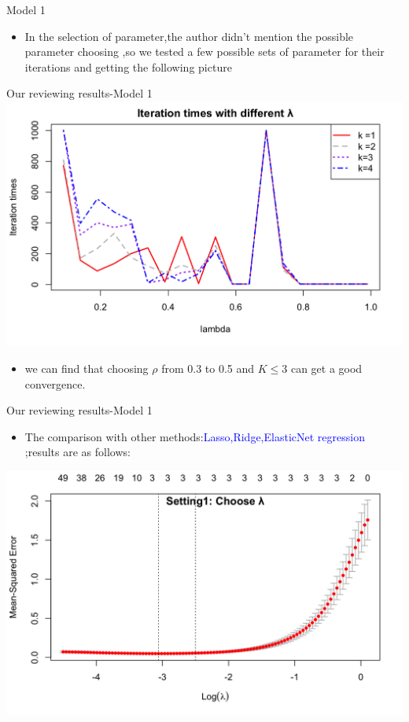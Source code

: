 \documentclass{beamer}
\begin{document}
\begin{frame}{Model 1}
    \begin{itemize}
        \item In the selection of parameter,the author didn't mention the possible parameter choosing ,so we tested a few possible sets of parameter for their iterations and getting the following picture 
    \end{itemize}
\end{frame}
\begin{frame}{Our reviewing results-Model 1}
    \includegraphics[scale=0.2]{plot1.png}
    \begin{itemize}
        \item we can find that choosing $\rho $ from 0.3 to 0.5 and $K\leqslant3 $ can get a good convergence.
    \end{itemize}
\end{frame}



\begin{frame}{Our reviewing results-Model 1}
    \begin{itemize}
        \item The comparison with other methods:\textcolor{blue}{Lasso,Ridge,ElasticNet regression} ;results are as follows:
    \end{itemize}
    \includegraphics[scale=0.2]{1.3.png}
\end{frame}
\end{document}
